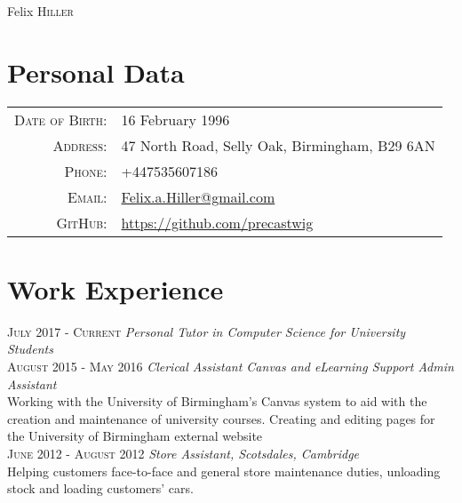 \documentclass[a4paper, 10pt]{article}
\begin{document}
\pagestyle{empty}

\par{\centering
		{\Huge Felix \textsc{Hiller}
	}\bigskip\par}

\section{Personal Data}

\begin{tabular}{rl}
    \textsc{Date of Birth:} & 16 February 1996\\
    \textsc{Address:}   & 47 North Road, Selly Oak, Birmingham, B29 6AN\\
    \textsc{Phone:}     & +447535607186\\
    \textsc{Email:}     & \href{mailto:Felix.a.Hiller@gmail.com}{Felix.a.Hiller@gmail.com}\\
	\textsc{GitHub:}	& \url{https://github.com/precastwig}
\end{tabular}

\section{Work Experience}

 \textsc{July 2017 - Current} \emph{Personal Tutor in Computer Science for University Students}\\
 \textsc{August 2015 - May 2016} \emph{Clerical Assistant Canvas and eLearning Support Admin Assistant}\\
 \footnotesize{Working with the University of Birmingham's Canvas system to aid with the creation and maintenance of university courses. Creating and editing pages for the University of Birmingham external website}\\
 \normalsize\textsc{June 2012 - August 2012} \emph{Store Assistant, Scotsdales, Cambridge}\\
 \footnotesize{Helping customers face-to-face and general store maintenance duties, unloading stock and loading customers' cars.}
\normalsize
\end{document}
